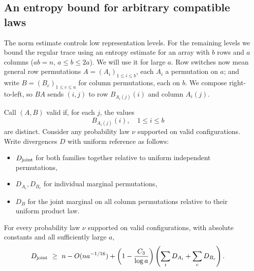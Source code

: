 \subsection{An entropy bound for arbitrary compatible laws}
\label{tra:projection-deletion:grid-law-definition}
The norm estimate controls low representation levels. For the remaining levels we bound the regular trace using an entropy estimate for an array with \(b\) rows and \(a\) columns (\(ab=n\), \(a\le b\le 2a\)). We will use it for large \(a\). Row switches now mean general row permutations \(A=(A_i)_{1\le i\le b}\), each \(A_i\) a permutation on \(a\); and write \(B=(B_c)_{1\le c\le a}\) for column permutations, each on \(b\). We compose right-to-left, so \(BA\) sends \((i,j)\) to row \(B_{A_i(j)}(i)\) and column \(A_i(j)\).

Call \((A,B)\) valid if, for each \(j\), the values
\[
B_{A_i(j)}(i),\quad 1\le i\le b
\]
are distinct. Consider any probability law \(\nu\) supported on valid configurations. Write divergences \(D\) with uniform reference as follows:
\begin{itemize}
\item \(D_{\rm joint}\) for both families together relative to uniform independent permutations,
\item \(D_{A_i},D_{B_c}\) for individual marginal permutations,
\item \(D_B\) for the joint marginal on all column permutations relative to their uniform product law.
\end{itemize}
\begin{proposition}\label{tra:projection-deletion:entropy}
\label{tra:projection-deletion:entropy-statement}
For every probability law $\nu$ supported on valid configurations, with absolute constants and all sufficiently large \(a\),
\begin{equation}
D_{\rm joint}
\ \ge\ n-O(n a^{-1/16})
 +\left(1-\frac{C_3}{\log a}\right)\left(\sum_i D_{A_i}+\sum_c D_{B_c}\right).
\label{tra:projection-deletion:eq9}
\end{equation}
\end{proposition}
